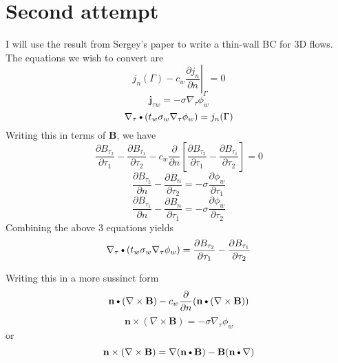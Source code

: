 \documentclass[11pt]{article}
\newcommand{\B}{\mathbf{B}}
\newcommand{\curl}{\nabla \times}
\newcommand{\PD}{\partial}
\newcommand{\J}{\mathbf{j}}
\newcommand{\N}{\mathbf{n}}
\newcommand{\DOT}{\text{\textbullet}}
\begin{document}
\section{Second attempt}
I will use the result from Sergey's paper to write a thin-wall BC for 3D flows. The equations we wish to convert are
\begin{equation}
  j_n (\Gamma) -
  c_w
  \left. \frac{\PD j_n}{\PD n} \right|_{\Gamma} = 0
\end{equation}
\begin{equation}
  \J_{\tau w} = -\sigma \nabla_{\tau} \phi_w
\end{equation}
\begin{equation}
  \nabla_{\tau} \DOT (t_w \sigma_w \nabla_{\tau} \phi_w) = j_n(\Gamma)
\end{equation}
Writing this in terms of $\B$, we have
\begin{equation}
  \frac{\PD B_{\tau_2}}{\PD \tau_1} - \frac{\PD B_{\tau_1}}{\PD \tau_2}
  -
  c_w
  \frac{\PD}{\PD n}
  \left[
  \frac{\PD B_{\tau_2}}{\PD \tau_1} - \frac{\PD B_{\tau_1}}{\PD \tau_2}
  \right] = 0
\end{equation}
\begin{equation}
  \frac{\PD B_{\tau_2}}{\PD n} - \frac{\PD B_n}{\PD \tau_{2}} = -\sigma \frac{\PD \phi_w}{\PD \tau_1}
\end{equation}
\begin{equation}
  \frac{\PD B_{\tau_1}}{\PD n} - \frac{\PD B_n}{\PD \tau_{1}} = -\sigma \frac{\PD \phi_w}{\PD \tau_2}
\end{equation}
Combining the above 3 equations yields
\begin{equation}
  \nabla_{\tau} \DOT (t_w \sigma_w \nabla_{\tau} \phi_w) = 
  \frac{\PD B_{\tau_2}}{\PD \tau_1} - \frac{\PD B_{\tau_1}}{\PD \tau_2}
\end{equation}

Writing this in a more sussinct form
\begin{equation}
  \N \DOT (\curl \B) - c_w \frac{\PD }{\PD n} (\N \DOT (\curl \B))
\end{equation}
\begin{equation}
  \N \times (\curl \B) = - \sigma \nabla_{\tau} \phi_w
\end{equation}
or
\begin{equation}
  \N \times (\curl \B) = \nabla (\N \DOT \B) - \B (\N \DOT \nabla)
\end{equation}
\end{document}
